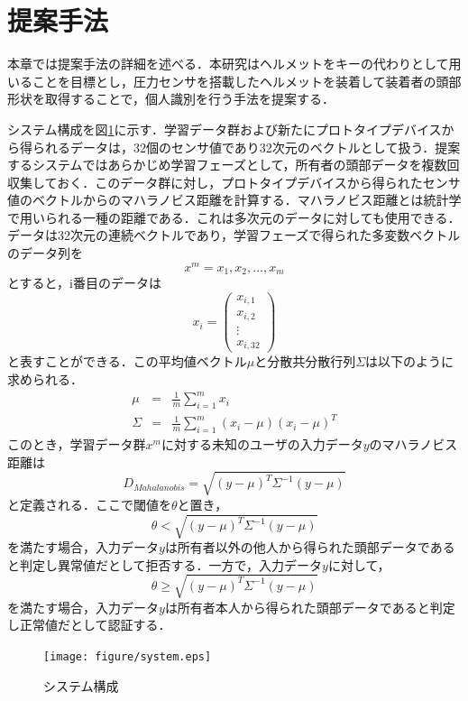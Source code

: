 \documentclass[Japanese,noauthor]{dicomopapers}
\begin{document}
\section{提案手法}
\label{method}
本章では提案手法の詳細を述べる．本研究はヘルメットをキーの代わりとして用いることを目標とし，圧力センサを搭載したヘルメットを装着して装着者の頭部形状を取得することで，個人識別を行う手法を提案する．\par
システム構成を図\ref{system}に示す．学習データ群および新たにプロトタイプデバイスから得られるデータは，32個のセンサ値であり32次元のベクトルとして扱う．提案するシステムではあらかじめ学習フェーズとして，所有者の頭部データを複数回収集しておく．このデータ群に対し，プロトタイプデバイスから得られたセンサ値のベクトルからのマハラノビス距離を計算する．マハラノビス距離とは統計学で用いられる一種の距離である．これは多次元のデータに対しても使用できる．データは32次元の連続ベクトルであり，学習フェーズで得られた多変数ベクトルのデータ列を
\[
  x^m = x_1, x_2, \ldots, x_m
\]
とすると，i番目のデータは
\[
  x_i = \left(
        \begin{array}{c}
            x_{i,1} \\
            x_{i,2} \\
            \vdots \\
            x_{i,32}
        \end{array}
    \right)
\]
と表すことができる．この平均値ベクトル$\mu$と分散共分散行列$\Sigma$は以下のように求められる．
\begin{eqnarray*}
  \mu &=& \frac{1}{m}\sum_{i=1}^{m}x_i \\
  \Sigma &=& \frac{1}{m}\sum_{i=1}^{m}(x_i-\mu)(x_i-\mu)^T
\end{eqnarray*}
このとき，学習データ群$x^m$に対する未知のユーザの入力データ$y$のマハラノビス距離は
\[
  D_{Mahalanobis} = \sqrt{(y-\mu)^{T}\Sigma^{-1}(y-\mu)}
\]
と定義される．ここで閾値を$\theta$と置き，
\[
  \theta < \sqrt{(y-\mu)^{T}\Sigma^{-1}(y-\mu)}
\]
を満たす場合，入力データ$y$は所有者以外の他人から得られた頭部データであると判定し異常値だとして拒否する．一方で，入力データ$y$に対して，
\[
  \theta \geq \sqrt{(y-\mu)^{T}\Sigma^{-1}(y-\mu)}
\]
を満たす場合，入力データ$y$は所有者本人から得られた頭部データであると判定し正常値だとして認証する．

\begin{figure}[!t]
  \begin{center}
    \texttt{[image: figure/system.eps]}
  \end{center}
  \caption{システム構成}
  \label{system}
\end{figure}
\end{document}
